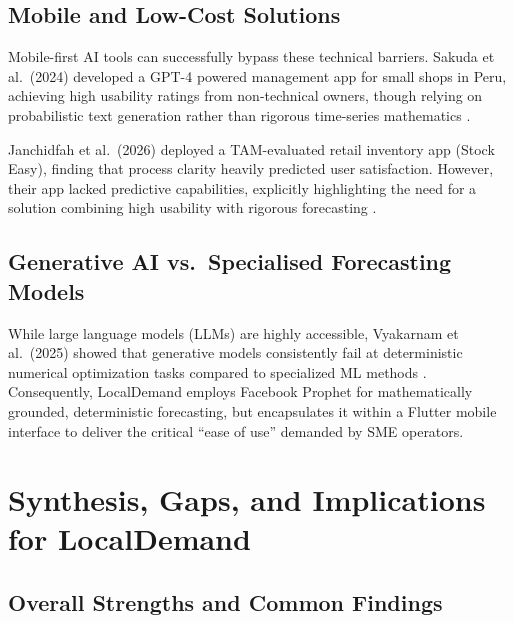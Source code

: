 \documentclass[conference]{IEEEtran}
\begin{document}
\subsection{Mobile and Low-Cost Solutions}

Mobile-first AI tools can successfully bypass these technical barriers. 
Sakuda et al.\ (2024) developed a GPT-4 powered management app for small 
shops in Peru, achieving high usability ratings from non-technical owners, 
though relying on probabilistic text generation rather than rigorous 
time-series mathematics \cite{sakuda2024}. 

Janchidfah et al.\ (2026) deployed a TAM-evaluated retail inventory app 
(Stock Easy), finding that process clarity heavily predicted user 
satisfaction. However, their app lacked predictive capabilities, explicitly 
highlighting the need for a solution combining high usability with rigorous 
forecasting \cite{janchidfah2026}.

\subsection{Generative AI vs.\ Specialised Forecasting Models}

While large language models (LLMs) are highly accessible, Vyakarnam et al.\ 
(2025) showed that generative models consistently fail at deterministic 
numerical optimization tasks compared to specialized ML methods 
\cite{vyakarnam2025}. Consequently, LocalDemand employs Facebook Prophet for 
mathematically grounded, deterministic forecasting, but encapsulates it within 
a Flutter mobile interface to deliver the critical ``ease of use'' demanded 
by SME operators.

\section{Synthesis, Gaps, and Implications for LocalDemand}

\subsection{Overall Strengths and Common Findings}
\end{document}
